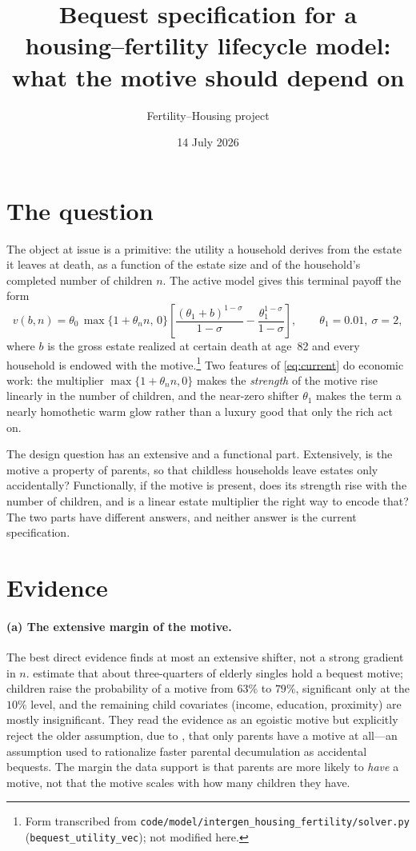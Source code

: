 \documentclass[10pt]{article}
\title{Bequest specification for a housing--fertility lifecycle model:\\
what the motive should depend on}
\author{Fertility--Housing project}
\date{14 July 2026}
\begin{document}
\maketitle

\section{The question}

The object at issue is a primitive: the utility a household derives from the
estate it leaves at death, as a function of the estate size and of the
household's completed number of children $n$. The active model gives this
terminal payoff the form
%
\begin{equation}
v(b,n)=\theta_0\,\max\{1+\theta_n n,\,0\}
\left[\frac{(\theta_1+b)^{1-\sigma}}{1-\sigma}
-\frac{\theta_1^{1-\sigma}}{1-\sigma}\right],
\qquad \theta_1=0.01,\ \sigma=2,
\label{eq:current}
\end{equation}
%
where $b$ is the gross estate realized at certain death at age~82 and every
household is endowed with the motive.\footnote{Form transcribed from
\texttt{code/model/intergen\_housing\_fertility/solver.py}
(\texttt{bequest\_utility\_vec}); not modified here.} Two features of
\eqref{eq:current} do economic work: the multiplier $\max\{1+\theta_n n,0\}$
makes the \emph{strength} of the motive rise linearly in the number of
children, and the near-zero shifter $\theta_1$ makes the term a nearly
homothetic warm glow rather than a luxury good that only the rich act on.

The design question has an extensive and a functional part. Extensively, is
the motive a property of parents, so that childless households leave estates
only accidentally? Functionally, if the motive is present, does its strength
rise with the number of children, and is a linear estate multiplier the right
way to encode that? The two parts have different answers, and neither answer
is the current specification.

\section{Evidence}

\paragraph{(a) The extensive margin of the motive.} The best direct evidence
finds at most an extensive shifter, not a strong gradient in $n$.
\citet{kopczuk2007} estimate that about three-quarters of elderly singles hold
a bequest motive; children raise the probability of a motive from $63\%$ to
$79\%$, significant only at the $10\%$ level, and the remaining child
covariates (income, education, proximity) are mostly insignificant. They read
the evidence as an egoistic motive but explicitly reject the older assumption,
due to \citet{hurd1989}, that only parents have a motive at all---an
assumption \citeauthor{hurd1989} used to rationalize faster parental
decumulation as accidental bequests. The margin the data support is that
parents are more likely to \emph{have} a motive, not that the motive scales
with how many children they have.
\end{document}
